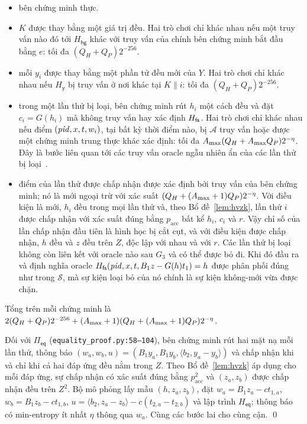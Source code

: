 \begin{itemize}
\item[$G_0$:] bên chứng minh thực.
\item[$G_1$:] $K$ được thay bằng một giá trị đều. Hai trò chơi chỉ khác nhau
  nếu một truy vấn nào đó tới $H_{\mathsf{hg}}$ khác với truy vấn của chính bên
  chứng minh bắt đầu bằng $e$: tối đa $(Q_H+Q_P)2^{-256}$.
\item[$G_2$:] mỗi $y_i$ được thay bằng một phần tử đều mới của $Y$. Hai trò
  chơi chỉ khác nhau nếu $H_{\mathsf y}$ bị truy vấn ở nơi khác tại $K\|i$: tối
  đa $(Q_H+Q_P)2^{-256}$.
\item[$G_3$:] trong một lần thử bị loại, bên chứng minh rút $h_i$ một cách đều
  và đặt $c_i=G(h_i)$ mà không truy vấn hay xác định $H_{\mathsf{fs}}$. Hai trò chơi chỉ
  khác nhau nếu điểm $(\mathit{pid},x,t,w_i)$, tại bất kỳ thời điểm nào, bị $\mathcal A$
  truy vấn hoặc được một chứng minh trung thực khác xác định: tối đa
  $A_{\max}(Q_H+A_{\max} Q_P)2^{-\eta}$. Đây là bước liên quan tới các truy vấn
  oracle ngẫu nhiên ẩn của các lần thử bị loại~\cite{ref:barbosa,ref:devevey}.
\item[$G_4$:] điểm của lần thử được chấp nhận được xác định bởi truy vấn của
  bên chứng minh; nó là mới ngoại trừ với xác suất $(Q_H+(A_{\max}+1)Q_P)2^{-\eta}$.
  Với điều kiện là mới, $h_i$ đều trong mọi lần thử và, theo
  Bổ đề~\ref{lem:hvzk}, lần thử $i$ được chấp nhận với xác suất đúng bằng
  $p_{\mathrm{acc}}$ bất kể $h_i$, $c_i$ và $r$. Vậy chỉ số của lần chấp nhận
  đầu tiên là hình học bị cắt cụt, và với điều kiện được chấp nhận, $h$ đều và
  $z$ đều trên $Z$, độc lập với nhau và với $r$. Các lần thử bị loại không còn
  liên kết với oracle nào sau $G_3$ và có thể được bỏ đi. Khi đó đầu ra và định
  nghĩa oracle $H_{\mathsf{fs}}(\mathit{pid},x,t,B_1z-G(h)t_1)=h$ được phân phối đúng như trong
  $\mathcal S$, mà sự kiện loại bỏ của nó chính là sự kiện không-mới vừa được
  chặn.
\end{itemize}
Tổng trên mỗi chứng minh là $2(Q_H+Q_P)2^{-256}+(A_{\max}+1)(Q_H+(A_{\max}+1)Q_P)2^{-\eta}$.

Đối với $\Pi_{\mathsf{eq}}$ (\texttt{equality\_proof.py:58--104}), bên chứng
minh rút hai mặt nạ mỗi lần thử, thông báo $(w_a,w_b,u)=(B_1y_a,B_1y_b,\langle b_2,y_a-y_b\rangle)$
và chấp nhận khi và chỉ khi cả hai đáp ứng đều nằm trong $Z$. Theo
Bổ đề~\ref{lem:hvzk} áp dụng cho mỗi đáp ứng, sự chấp nhận có xác suất đúng bằng
$p_{\mathrm{acc}}^2$ và $(z_a,z_b)$ được chấp nhận đều trên $Z^2$. Bộ mô phỏng
lấy mẫu $(h,z_a,z_b)$, đặt $w_a=B_1z_a-ct_{1,a}$, $w_b=B_1z_b-ct_{1,b}$,
$u=\langle b_2,z_a-z_b\rangle-c(t_{2,a}-t_{2,b})$ và lập trình $H_{\mathsf{eq}}$;
thông báo có min-entropy ít nhất $\eta$ thông qua $w_a$. Cùng các bước lai cho
cùng cận. \qed

